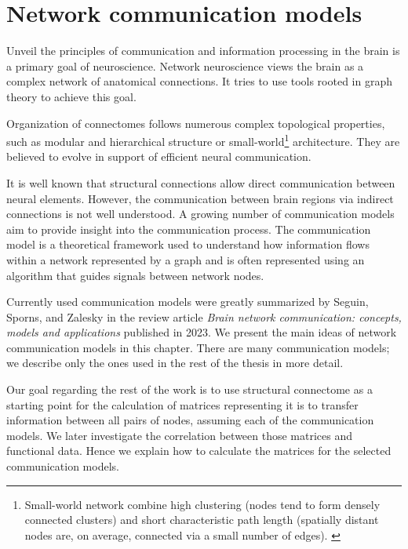 \chapter{Network communication models}\label{ch:networks}

Unveil the principles of communication and information processing in the brain is a primary goal of neuroscience. Network neuroscience views the brain as a complex network of anatomical connections. It tries to use tools rooted in graph theory to achieve this goal.  

Organization of connectomes follows numerous complex topological properties, such as modular and hierarchical structure or small-world\footnote{Small-world network combine high clustering (nodes tend to form densely connected clusters) and short characteristic path length (spatially distant nodes are, on average, connected via a small number of edges). \cite{seguin_brain_2023}} architecture. They are believed to evolve in support of efficient neural communication. \cite{seguin_brain_2023,avena-koenigsberger_communication_2018}

It is well known that structural connections allow direct communication between neural elements. However, the communication between brain regions via indirect connections is not well understood. A growing number of communication models aim to provide insight into the communication process. The communication model is a theoretical framework used to understand how information flows within a network represented by a graph and is often represented using an algorithm that guides signals between network nodes. \cite{seguin_brain_2023}

Currently used communication models were greatly summarized by Seguin, Sporns, and Zalesky in the review article \textit{Brain network communication: concepts, models and applications} published in 2023. \cite{seguin_brain_2023} We present the main ideas of network communication models in this chapter. There are many communication models; we describe only the ones used in the rest of the thesis in more detail.

Our goal regarding the rest of the work is to use structural connectome as a starting point for the calculation of matrices representing  it is to transfer information between all pairs of nodes, assuming each of the communication models. We later investigate the correlation between those matrices and functional data. Hence we explain how to calculate the matrices for the selected communication models.


